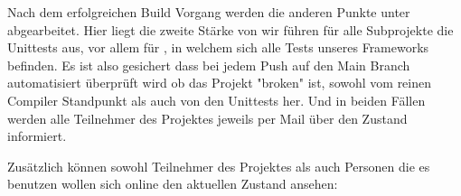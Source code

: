Nach dem erfolgreichen Build Vorgang werden die anderen Punkte unter  abgearbeitet. Hier liegt die zweite Stärke von  wir führen für alle Subprojekte die Unittests aus, vor allem für , in welchem sich alle Tests unseres Frameworks befinden.
Es ist also gesichert dass bei jedem Push auf den Main Branch automatisiert überprüft wird ob das Projekt "broken" ist, sowohl vom reinen Compiler Standpunkt als auch von den Unittests her. Und in beiden Fällen werden alle Teilnehmer des Projektes jeweils per Mail über den Zustand informiert.

Zusätzlich können sowohl Teilnehmer des Projektes als auch Personen die es benutzen wollen sich online den aktuellen Zustand ansehen:

